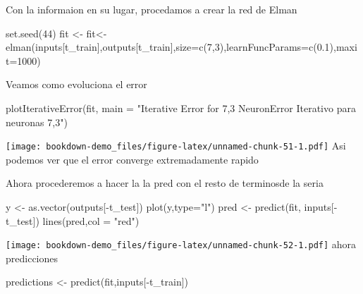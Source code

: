 \documentclass[
]{book}
\newenvironment{Shaded}{\begin{snugshade}}{\end{snugshade}}
\newcommand{\AttributeTok}[1]{\textcolor[rgb]{0.77,0.63,0.00}{#1}}
\newcommand{\DecValTok}[1]{\textcolor[rgb]{0.00,0.00,0.81}{#1}}
\newcommand{\FloatTok}[1]{\textcolor[rgb]{0.00,0.00,0.81}{#1}}
\newcommand{\FunctionTok}[1]{\textcolor[rgb]{0.00,0.00,0.00}{#1}}
\newcommand{\NormalTok}[1]{#1}
\newcommand{\OtherTok}[1]{\textcolor[rgb]{0.56,0.35,0.01}{#1}}
\newcommand{\SpecialCharTok}[1]{\textcolor[rgb]{0.00,0.00,0.00}{#1}}
\newcommand{\StringTok}[1]{\textcolor[rgb]{0.31,0.60,0.02}{#1}}
\begin{document}
Con la informaion en su lugar, procedamos a crear la red de Elman

\begin{Shaded}
\begin{Highlighting}[]
\FunctionTok{set.seed}\NormalTok{(}\DecValTok{44}\NormalTok{)}
\NormalTok{fit }\OtherTok{\textless{}{-}}\NormalTok{ fit}\OtherTok{\textless{}{-}}\FunctionTok{elman}\NormalTok{(inputs[t\_train],outputs[t\_train],}\AttributeTok{size=}\FunctionTok{c}\NormalTok{(}\DecValTok{7}\NormalTok{,}\DecValTok{3}\NormalTok{),}\AttributeTok{learnFuncParams=}\FunctionTok{c}\NormalTok{(}\FloatTok{0.1}\NormalTok{),}\AttributeTok{maxit=}\DecValTok{1000}\NormalTok{)}
\end{Highlighting}
\end{Shaded}

Veamos como evoluciona el error

\begin{Shaded}
\begin{Highlighting}[]
\FunctionTok{plotIterativeError}\NormalTok{(fit, }\AttributeTok{main =} \StringTok{"Iterative Error for 7,3 NeuronError Iterativo para neuronas 7,3"}\NormalTok{)}
\end{Highlighting}
\end{Shaded}

\texttt{[image: bookdown-demo\_files/figure-latex/unnamed-chunk-51-1.pdf]}
Asi podemos ver que el error converge extremadamente rapido

Ahora procederemos a hacer la la pred con el resto de terminosde la seria

\begin{Shaded}
\begin{Highlighting}[]
\NormalTok{y }\OtherTok{\textless{}{-}} \FunctionTok{as.vector}\NormalTok{(outputs[}\SpecialCharTok{{-}}\NormalTok{t\_test])}
\FunctionTok{plot}\NormalTok{(y,}\AttributeTok{type=}\StringTok{"l"}\NormalTok{)}
\NormalTok{pred }\OtherTok{\textless{}{-}} \FunctionTok{predict}\NormalTok{(fit, inputs[}\SpecialCharTok{{-}}\NormalTok{t\_test])}
\FunctionTok{lines}\NormalTok{(pred,}\AttributeTok{col =} \StringTok{"red"}\NormalTok{)}
\end{Highlighting}
\end{Shaded}

\texttt{[image: bookdown-demo\_files/figure-latex/unnamed-chunk-52-1.pdf]}
ahora predicciones

\begin{Shaded}
\begin{Highlighting}[]
\NormalTok{predictions }\OtherTok{\textless{}{-}} \FunctionTok{predict}\NormalTok{(fit,inputs[}\SpecialCharTok{{-}}\NormalTok{t\_train])}
\end{Highlighting}
\end{Shaded}
\end{document}

